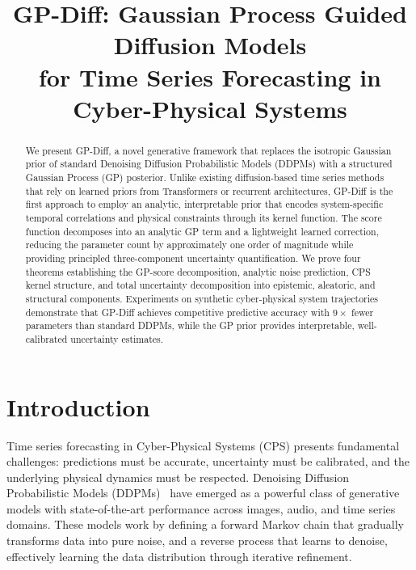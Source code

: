 \documentclass[conference]{IEEEtran}
\begin{document}
\title{GP-Diff: Gaussian Process Guided Diffusion Models\\for Time Series Forecasting in Cyber-Physical Systems}

\author{
\and
{}
}

\maketitle

\begin{abstract}
We present GP-Diff, a novel generative framework that replaces the isotropic Gaussian prior of standard Denoising Diffusion Probabilistic Models (DDPMs) with a structured Gaussian Process (GP) posterior. Unlike existing diffusion-based time series methods that rely on learned priors from Transformers or recurrent architectures, GP-Diff is the first approach to employ an analytic, interpretable prior that encodes system-specific temporal correlations and physical constraints through its kernel function. The score function decomposes into an analytic GP term and a lightweight learned correction, reducing the parameter count by approximately one order of magnitude while providing principled three-component uncertainty quantification. We prove four theorems establishing the GP-score decomposition, analytic noise prediction, CPS kernel structure, and total uncertainty decomposition into epistemic, aleatoric, and structural components. Experiments on synthetic cyber-physical system trajectories demonstrate that GP-Diff achieves competitive predictive accuracy with $9\times$ fewer parameters than standard DDPMs, while the GP prior provides interpretable, well-calibrated uncertainty estimates.
\end{abstract}

\section{Introduction}

Time series forecasting in Cyber-Physical Systems (CPS) presents fundamental challenges: predictions must be accurate, uncertainty must be calibrated, and the underlying physical dynamics must be respected. Denoising Diffusion Probabilistic Models (DDPMs)~\cite{Ho2020DDPM} have emerged as a powerful class of generative models with state-of-the-art performance across images, audio, and time series domains. These models work by defining a forward Markov chain that gradually transforms data into pure noise, and a reverse process that learns to denoise, effectively learning the data distribution through iterative refinement.
\end{document}
